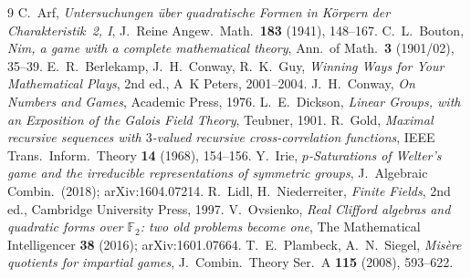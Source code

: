 \documentclass[11pt]{article}
\theoremstyle{definition}
\newcommand{\F}{\mathbb{F}}
\begin{document}
\begin{thebibliography}{9}
 C.~Arf, \emph{Untersuchungen \"uber quadratische Formen in
K\"orpern der Charakteristik~2, I}, J.\ Reine Angew.\ Math.\ \textbf{183}
(1941), 148--167.
 C.~L.~Bouton, \emph{Nim, a game with a complete mathematical
theory}, Ann.\ of Math.\ \textbf{3} (1901/02), 35--39.
 E.~R.~Berlekamp, J.~H.~Conway, R.~K.~Guy, \emph{Winning Ways for
Your Mathematical Plays}, 2nd ed., A~K Peters, 2001--2004.
 J.~H.~Conway, \emph{On Numbers and Games}, Academic Press,
1976.
 L.~E.~Dickson, \emph{Linear Groups, with an Exposition of
the Galois Field Theory}, Teubner, 1901.
 R.~Gold, \emph{Maximal recursive sequences with $3$-valued
recursive cross-correlation functions}, IEEE Trans.\ Inform.\ Theory \textbf{14}
(1968), 154--156.
 Y.~Irie, \emph{$p$-Saturations of Welter's game and the
irreducible representations of symmetric groups}, J.\ Algebraic Combin.\
(2018); arXiv:1604.07214.
 R.~Lidl, H.~Niederreiter, \emph{Finite Fields}, 2nd ed., Cambridge
University Press, 1997.
 V.~Ovsienko, \emph{Real Clifford algebras and quadratic
forms over $\F_2$: two old problems become one}, The Mathematical Intelligencer
\textbf{38} (2016); arXiv:1601.07664.
 T.~E.~Plambeck, A.~N.~Siegel, \emph{Misère quotients for impartial
games}, J.\ Combin.\ Theory Ser.\ A \textbf{115} (2008), 593--622.
\end{thebibliography}
\end{document}
